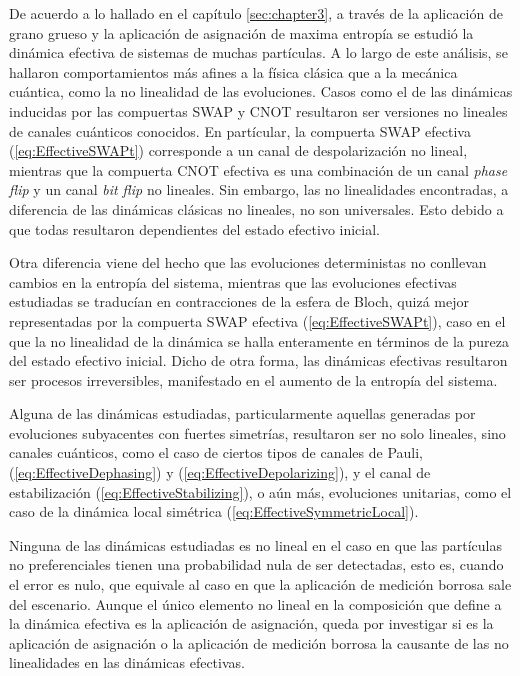 De acuerdo a lo hallado en el capítulo \ref{sec:chapter3}, a través de la aplicación de grano grueso y la aplicación de asignación de maxima entropía se estudió la dinámica efectiva de sistemas de muchas partículas. A lo largo de este análisis, se hallaron comportamientos más afines a la física clásica que a la mecánica cuántica, como la no linealidad de las evoluciones.  Casos como el de las dinámicas inducidas por las compuertas SWAP y CNOT resultaron ser versiones no lineales de canales cuánticos conocidos. En partícular, la compuerta SWAP efectiva (\ref{eq:EffectiveSWAPt}) corresponde a un canal de despolarización no lineal, mientras que la compuerta CNOT efectiva es una combinación de un canal \textit{phase flip} y un canal \textit{bit flip} no lineales. \acnote{|} Sin embargo, las no linealidades encontradas, a diferencia de las dinámicas clásicas no lineales, no son universales. Esto debido a que todas resultaron dependientes del estado efectivo inicial. 
%

Otra diferencia viene del hecho que las evoluciones deterministas \acnote{\checkmark} no conllevan cambios en la entropía del sistema, mientras que las evoluciones efectivas estudiadas se traducían en contracciones de la esfera de Bloch, quizá mejor representadas por la compuerta SWAP efectiva (\ref{eq:EffectiveSWAPt}), caso en el que la no linealidad de la dinámica se halla enteramente en términos de la pureza del estado efectivo inicial. Dicho de otra forma, las dinámicas efectivas resultaron ser procesos irreversibles, manifestado en el aumento de la entropía del sistema. \acnote{\checkmark}

Alguna de las dinámicas estudiadas, particularmente aquellas generadas por evoluciones subyacentes con fuertes simetrías, resultaron ser no solo lineales, sino canales cuánticos, como el caso de ciertos tipos de canales de Pauli, (\ref{eq:EffectiveDephasing}) y (\ref{eq:EffectiveDepolarizing}), y el canal de estabilización (\ref{eq:EffectiveStabilizing}), o aún más, evoluciones unitarias, como el caso de la dinámica local simétrica (\ref{eq:EffectiveSymmetricLocal}). 

Ninguna de las dinámicas estudiadas es no lineal en el caso en que las partículas no preferenciales tienen una probabilidad nula de ser detectadas, esto es, cuando el error es nulo, que equivale al caso en que la aplicación de medición borrosa sale del escenario. Aunque el único elemento no lineal en la composición que define a la dinámica efectiva es la aplicación de asignación, queda por investigar si es la aplicación de asignación o la aplicación de medición borrosa la causante de las no linealidades en las dinámicas efectivas.


